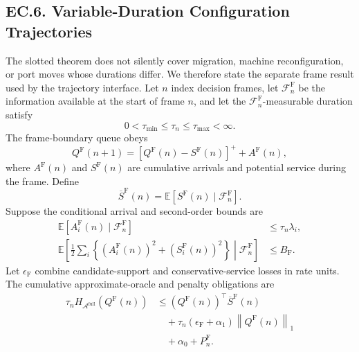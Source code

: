 \documentclass[opre,dblanonrev]{informs4}
\newcommand{\Afull}{\mathcal A^{\mathrm{full}}}
\newcommand{\E}{\mathbb E}
\newcommand{\normone}[1]{\left\|#1\right\|_1}
\begin{document}
\subsection*{EC.6. Variable-Duration Configuration Trajectories}

The slotted theorem does not silently cover migration, machine reconfiguration,
or port moves whose durations differ.  We therefore state the separate frame
result used by the trajectory interface.  Let \(n\) index decision frames, let
\(\mathcal F_n^{\mathrm F}\) be the information available at the start of frame
\(n\), and let the \(\mathcal F_n^{\mathrm F}\)-measurable duration satisfy
\begin{equation}
  0<\tau_{\min}\le \tau_n\le\tau_{\max}<\infty.
  \label{eq:frame-duration-bounds}
\end{equation}
The frame-boundary queue obeys
\begin{equation}
  Q^{\mathrm F}(n+1)
  =
  \left[Q^{\mathrm F}(n)-S^{\mathrm F}(n)\right]^+
  +A^{\mathrm F}(n),
  \label{eq:frame-queue-dynamics}
\end{equation}
where \(A^{\mathrm F}(n)\) and \(S^{\mathrm F}(n)\) are cumulative arrivals
and potential service during the frame.  Define
\begin{equation}
  \overline S^{\mathrm F}(n)
  =
  \E\!\left[S^{\mathrm F}(n)\mid\mathcal F_n^{\mathrm F}\right].
  \label{eq:frame-mean-service}
\end{equation}
Suppose the conditional arrival and second-order bounds are
\begin{align}
  \E\!\left[A_i^{\mathrm F}(n)\mid\mathcal F_n^{\mathrm F}\right]
  &\le \tau_n\lambda_i,
  \label{eq:frame-arrival-bound}\\
  \E\!\left[
    \frac12\sum_i
    \left\{(A_i^{\mathrm F}(n))^2+(S_i^{\mathrm F}(n))^2\right\}
    \middle|\mathcal F_n^{\mathrm F}
  \right]
  &\le B_{\mathrm F}.
  \label{eq:frame-second-moment}
\end{align}
Let \(\epsilon_{\mathrm F}\) combine candidate-support and conservative-service
losses in rate units.  The cumulative approximate-oracle and penalty obligations
are
\begin{equation}
  \begin{aligned}
  \tau_n H_{\Afull}\!\left(Q^{\mathrm F}(n)\right)
  &\le
  \left(Q^{\mathrm F}(n)\right)^{\!\top}
  \overline S^{\mathrm F}(n)\\
  &\quad+\tau_n(\epsilon_{\mathrm F}+\alpha_1)
    \normone{Q^{\mathrm F}(n)}\\
  &\quad+\alpha_0+P_n^{\mathrm F}.
  \end{aligned}
  \label{eq:frame-oracle}
\end{equation}
\end{document}

